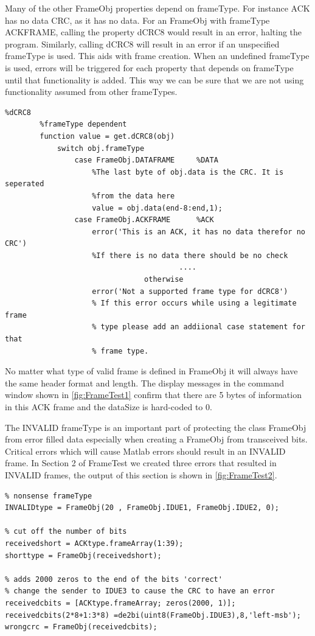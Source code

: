 Many of the other FrameObj properties depend on frameType. For instance ACK has no data CRC, as it has no data. For an FrameObj with frameType ACKFRAME, calling the property dCRC8 would result in an error, halting the program. Similarly, calling dCRC8 will result in an error if an unspecified frameType is used. This aids with frame creation. When an undefined frameType is used, errors will be triggered for each property that depends on frameType until that functionality is added. This way we can be sure that we are not using functionality assumed from other frameTypes. 
\begin{lstlisting} 
%dCRC8
        %frameType dependent
        function value = get.dCRC8(obj)
            switch obj.frameType
                case FrameObj.DATAFRAME     %DATA
                    %The last byte of obj.data is the CRC. It is seperated
                    %from the data here
                    value = obj.data(end-8:end,1);
                case FrameObj.ACKFRAME      %ACK
                    error('This is an ACK, it has no data therefor no CRC')
                    %If there is no data there should be no check
										....
								otherwise
                    error('Not a supported frame type for dCRC8')
                    % If this error occurs while using a legitimate frame
                    % type please add an addiional case statement for that
                    % frame type.
\end{lstlisting}

No matter what type of valid frame is defined in FrameObj it will always have the same header format and length. The display messages in the command window shown in \ref{fig:FrameTest1} confirm that there are 5 bytes of information in this ACK frame and the dataSize is hard-coded to 0. 

The INVALID frameType is an important part of protecting the class FrameObj from error filled data especially when creating a FrameObj from transceived bits. Critical errors which will cause Matlab errors should result in an INVALID frame. In Section 2 of FrameTest we created three errors that resulted in INVALID frames, the output of this section is shown in \ref{fig:FrameTest2}.
\begin{lstlisting} 
% nonsense frameType
INVALIDtype = FrameObj(20 , FrameObj.IDUE1, FrameObj.IDUE2, 0);

% cut off the number of bits
receivedshort = ACKtype.frameArray(1:39);
shorttype = FrameObj(receivedshort);

% adds 2000 zeros to the end of the bits 'correct'
% change the sender to IDUE3 to cause the CRC to have an error
receivedcbits = [ACKtype.frameArray; zeros(2000, 1)];
receivedcbits(2*8+1:3*8) =de2bi(uint8(FrameObj.IDUE3),8,'left-msb');
wrongcrc = FrameObj(receivedcbits);
\end{lstlisting} 

